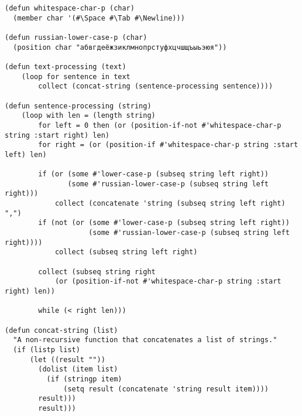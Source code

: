 \documentclass[12pt]{article}
\begin{document}
 
 
\lstset{style=mystyle} 

\begin{lstlisting}
(defun whitespace-char-p (char)
  (member char '(#\Space #\Tab #\Newline)))

(defun russian-lower-case-p (char)
  (position char "абвгдеёжзиклмнопрстуфхцчшщъыьэюя"))

(defun text-processing (text)
    (loop for sentence in text
        collect (concat-string (sentence-processing sentence))))

(defun sentence-processing (string)
    (loop with len = (length string)
        for left = 0 then (or (position-if-not #'whitespace-char-p string :start right) len)
        for right = (or (position-if #'whitespace-char-p string :start left) len)

        if (or (some #'lower-case-p (subseq string left right)) 
               (some #'russian-lower-case-p (subseq string left right)))
            collect (concatenate 'string (subseq string left right) ",")
        if (not (or (some #'lower-case-p (subseq string left right)) 
                    (some #'russian-lower-case-p (subseq string left right))))
            collect (subseq string left right)

        collect (subseq string right 
            (or (position-if-not #'whitespace-char-p string :start right) len))
        
        while (< right len)))

(defun concat-string (list)
  "A non-recursive function that concatenates a list of strings."
  (if (listp list)
      (let ((result ""))
        (dolist (item list)
          (if (stringp item)
              (setq result (concatenate 'string result item))))
        result)))
        result)))
\end{lstlisting}
\end{document}
